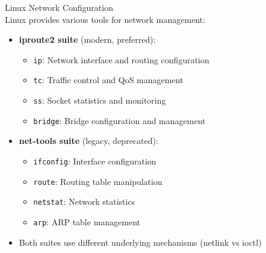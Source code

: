 \begin{definition}{Linux Network Configuration}\\
    Linux provides various tools for network management:
    \begin{itemize}
        \item \textbf{iproute2 suite} (modern, preferred):
            \begin{itemize}
                \item \texttt{ip}: Network interface and routing configuration
                \item \texttt{tc}: Traffic control and QoS management
                \item \texttt{ss}: Socket statistics and monitoring
                \item \texttt{bridge}: Bridge configuration and management
            \end{itemize}
        \item \textbf{net-tools suite} (legacy, deprecated):
            \begin{itemize}
                \item \texttt{ifconfig}: Interface configuration
                \item \texttt{route}: Routing table manipulation
                \item \texttt{netstat}: Network statistics
                \item \texttt{arp}: ARP table management
            \end{itemize}
        \item Both suites use different underlying mechanisms (netlink vs ioctl)
    \end{itemize}
\end{definition}

